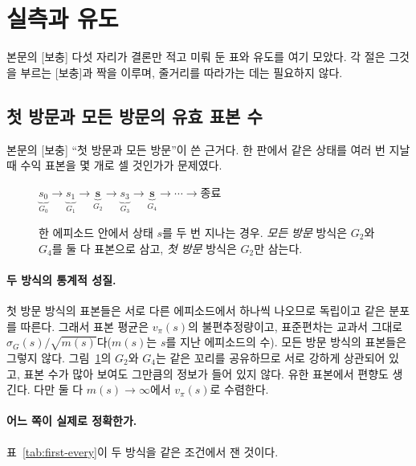 \documentclass[11pt,a4paper]{article}
\begin{document}
\section{실측과 유도}
\label{app:main}

본문의 [보충] 다섯 자리가 결론만 적고 미뤄 둔 표와 유도를 여기 모았다. 각 절은 그것을 부르는
[보충]과 짝을 이루며, 줄거리를 따라가는 데는 필요하지 않다.
\subsection{첫 방문과 모든 방문의 유효 표본 수}
\label{app:first-every}

본문의 [보충] ``첫 방문과 모든 방문''이 쓴 근거다. 한 판에서 같은 상태를 여러 번 지날 때 수익
표본을 몇 개로 셀 것인가가 문제였다.

\begin{figure}[htbp]
\centering
\small
$\displaystyle
  \underbrace{s_0}_{G_0} \to \underbrace{s_1}_{G_1} \to \underbrace{\mathbf{s}}_{G_2}
  \to \underbrace{s_3}_{G_3} \to \underbrace{\mathbf{s}}_{G_4} \to \cdots \to \text{종료}$
\caption{한 에피소드 안에서 상태 $s$를 두 번 지나는 경우. \emph{모든 방문} 방식은 $G_2$와 $G_4$를 둘 다
표본으로 삼고, \emph{첫 방문} 방식은 $G_2$만 삼는다.}
\label{fig:revisit}
\end{figure}

\paragraph{두 방식의 통계적 성질.}
첫 방문 방식의 표본들은 서로 다른 에피소드에서 하나씩 나오므로 독립이고 같은 분포를 따른다. 그래서
표본 평균은 $v_\pi(s)$의 불편추정량이고, 표준편차는 교과서 그대로
$\sigma_G(s)/\sqrt{m(s)}$다($m(s)$는 $s$를 지난 에피소드의 수). 모든 방문 방식의 표본들은 그렇지
않다. 그림~\ref{fig:revisit}의 $G_2$와 $G_4$는 같은 꼬리를 공유하므로 서로 강하게 상관되어 있고,
표본 수가 많아 보여도 그만큼의 정보가 들어 있지 않다. 유한 표본에서 편향도 생긴다. 다만 둘 다
$m(s)\to\infty$에서 $v_\pi(s)$로 수렴한다\cite{singh}.

\paragraph{어느 쪽이 실제로 정확한가.}
표~\ref{tab:first-every}이 두 방식을 같은 조건에서 잰 것이다.
\end{document}
